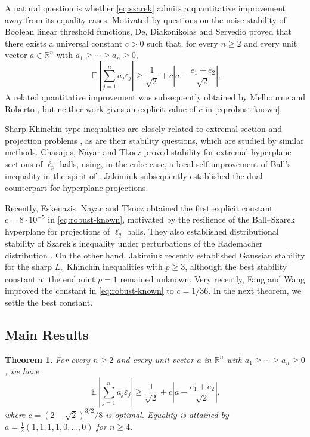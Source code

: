 \documentclass[a4paper,twoside,11pt,reqno]{amsart}
\newtheorem{theorem}{Theorem}
\theoremstyle{definition}
\theoremstyle{remark}
\newcommand{\1}{\mathbbm{1}}
\newcommand{\R}{\mathbb{R}}
\DeclareMathOperator{\E}{\mathbb{E}}
\def \R {\mathbb{R}}
\begin{document}
A natural question is whether \eqref{eq:szarek} admits a quantitative improvement away from its equality cases. Motivated by questions on the noise stability of Boolean linear threshold functions, De, Diakonikolas and Servedio \cite[Theorem~9]{DDS16} proved that there exists a universal constant $c>0$ such that, for every $n\ge2$ and every unit vector $a\in\R^n$ with $a_1\ge\cdots\ge a_n\ge0$,
\begin{equation}\label{eq:robust-known}
 \E\left|\sum_{j=1}^n a_j\varepsilon_j\right|
 \ge\frac1{\sqrt2}+c\left|a-\frac{e_1+e_2}{\sqrt2}\right|.
\end{equation}
A related quantitative improvement was subsequently obtained by Melbourne and Roberto \cite{MR22}, but neither work gives an explicit value of $c$ in \eqref{eq:robust-known}.

Sharp Khinchin-type inequalities are closely related to extremal section and projection problems \cite{NT23}, as are their stability questions, which are studied by similar methods. Chasapis, Nayar and Tkocz \cite{CNT22} proved stability for extremal hyperplane sections of $\ell_p$ balls, using, in the cube case, a local self-improvement of Ball's inequality in the spirit of \cite{DDS16}. Jakimiuk \cite{Jak26b} subsequently established the dual counterpart for hyperplane projections.

Recently, Eskenazis, Nayar and Tkocz \cite{ENT24} obtained the first explicit constant $c=8\cdot10^{-5}$ in \eqref{eq:robust-known}, motivated by the resilience of the Ball--Szarek hyperplane for projections of $\ell_q$ balls. They also established distributional stability of Szarek's inequality under perturbations of the Rademacher distribution \cite{ENTDist24}. On the other hand, Jakimiuk \cite{Jak26a} recently established Gaussian stability for the sharp $L_p$ Khinchin inequalities with $p\ge3$, although the best stability constant at the endpoint $p=1$ remained unknown. Very recently, Fang and Wang \cite[Theorem~3]{FW26} improved the constant in \eqref{eq:robust-known} to $c=1/36$. In the next theorem, we settle the best constant.

\subsection{Main Results}

\begin{theorem}\label{thm:stable}
For every $n\ge2$ and every unit vector $a$ in $\R^n$ with $a_1\ge\cdots\ge a_n\ge0$, we have
\begin{equation}\label{eq:stable}
 \E\left|\sum_{j=1}^n a_j\varepsilon_j\right|
 \ge\frac1{\sqrt2}+c\left|a-\frac{e_1+e_2}{\sqrt2}\right|,
\end{equation}
where $c=(2-\sqrt2)^{3/2}/8$ is optimal. Equality is attained by $a=\frac12(1,1,1,1,0,\ldots,0)$ for $n\ge4$.
\end{theorem}
\end{document}
